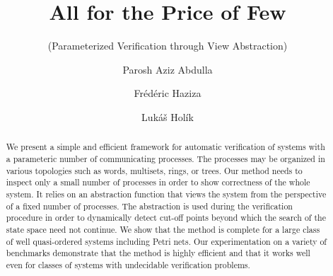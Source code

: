 
\title{All for the Price of Few}
\subtitle{\footnotesize (Parameterized Verification through View Abstraction)}




\author{Parosh Aziz Abdulla  \and Fr\'ed\'eric Haziza \and Luk\'a\v s Hol\'ik }

\maketitle



\begin{abstract}
  We present a simple and efficient framework for automatic
  verification of systems with a parameteric number of communicating
  processes.
  The processes may be organized in various topologies
  such as words, multisets, rings, or trees.
  Our method needs to inspect only a small number of processes in
  order to show correctness of the whole system. It relies on an
  abstraction function that views the system from the perspective of a
  fixed number of processes. The abstraction is used during the
  verification procedure in order to dynamically detect cut-off points
  beyond which the search of the state space need not continue.
  We show that the method is complete for a large class of well
  quasi-ordered systems including Petri nets.
  Our experimentation on a variety of benchmarks demonstrate that the
  method is highly efficient and that it works well even for classes
  of systems with undecidable verification problems.
\end{abstract}




